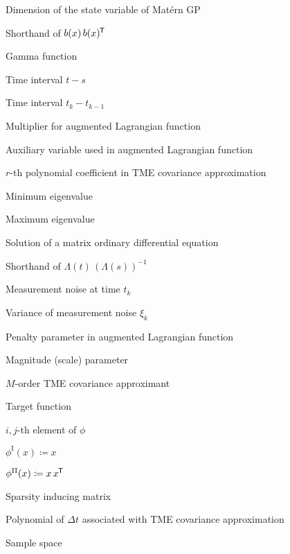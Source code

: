 \begin{description}[style=multiline,leftmargin=3cm]
\item[$\gamma$] Dimension of the state variable of Mat\'{e}rn GP
\item[$\Gamma$] Shorthand of $b(x) \, b(x)^{\mkern-1.5mu\mathsf{T}}$
\item[$\varGamma$] Gamma function
\item[$\Delta t$] Time interval $t-s$
\item[$\Delta t_k$] Time interval $t_k-t_{k-1}$
\item[$\eta$] Multiplier for augmented Lagrangian function
\item[$\theta$] Auxiliary variable used in augmented Lagrangian function
\item[$\Theta_{r}$] $r$-th polynomial coefficient in TME covariance approximation
\item[$\mineig$] Minimum eigenvalue
\item[$\maxeig$] Maximum eigenvalue
\item[$\Lambda(t)$] Solution of a matrix ordinary differential equation
\item[$\cu{\Lambda}(t, s)$] Shorthand of $\Lambda(t) \, (\Lambda(s))^{-1}$
\item[$\xi_k$] Measurement noise at time $t_k$
\item[$\Xi_k$] Variance of measurement noise $\xi_k$
\item[$\rho$] Penalty parameter in augmented Lagrangian function
\item[$\sigma$] Magnitude (scale) parameter
\item[$\Sigma_M$] $M$-order TME covariance approximant
\item[$\phi$] Target function
\item[$\phi_{ij}$] $i,j$-th element of $\phi$
\item[$\phi^\mathrm{I}$] $\phi^\mathrm{I}(x) \coloneqq x$
\item[$\phi^\mathrm{II}$] $\phi^\mathrm{II}(x) \coloneqq x \, x^{\mkern-1.5mu\mathsf{T}}$
\item[$\Phi$] Sparsity inducing matrix
\item[$\chi(\Delta t)$] Polynomial of $\Delta t$ associated with TME covariance approximation
\item[$\Omega$] Sample space


\end{description}
